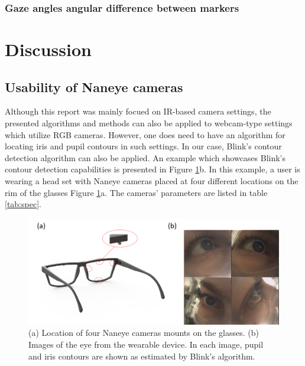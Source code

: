 \documentclass{article}
\begin{document}
\subsubsection{Gaze angles angular difference between markers}
       

\section{Discussion}
\subsection{Usability of Naneye cameras}
Although this report was mainly focued on IR-based camera settings, the presented algorithms and methods can also be applied to webcam-type settings which utilize RGB cameras.  However, one does need to have an algorithm for locating iris and pupil contours in such settings. In our case, Blink's contour detection algorithm can also be applied. An example which showcases Blink's contour detection capabilities is presented in Figure \ref{fig:naneye}b. In this example, a user is wearing a head set with Naneye cameras placed at four different locations on the rim of the glasses Figure \ref{fig:naneye}a. The cameras' parameters are listed in table \ref{tab:spec}. 

\begin{figure}[h!]
    \center
    \includegraphics[scale=0.4]{./Pics/naneye2.png}
    \caption{(a) Location of four Naneye cameras mounts on the glasses. (b) Images of the eye from the wearable device. In each image, pupil and iris contours are shown as estimated by Blink's algorithm.} 
    \label{fig:naneye}
\end{figure}
 
\end{document}
